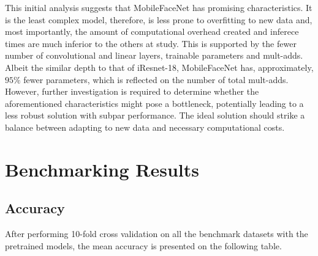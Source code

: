 \documentclass[class=report, crop=false, a4paper, 12pt]{standalone}
\begin{document}
\par This initial analysis suggests that MobileFaceNet has promising characteristics. It is the least complex model, therefore, is less prone to overfitting to new data and, most importantly, the amount of computational overhead created and inferece times are much inferior to the others at study. This is supported by the fewer number of convolutional and linear layers, trainable parameters and mult-adds. Albeit the similar depth to that of iResnet-18, MobileFaceNet has, approximately, $95\%$ fewer parameters, which is reflected on the number of total mult-adds. However, further investigation is required to determine whether the aforementioned characteristics might pose a bottleneck, potentially leading to a less robust solution with subpar performance. The ideal solution should strike a balance between adapting to new data and necessary computational costs.

\section{Benchmarking Results}
\subsection{Accuracy}

\par After performing 10-fold cross validation on all the benchmark datasets with the pretrained models, the mean accuracy is presented on the following table.

 
\end{document}
